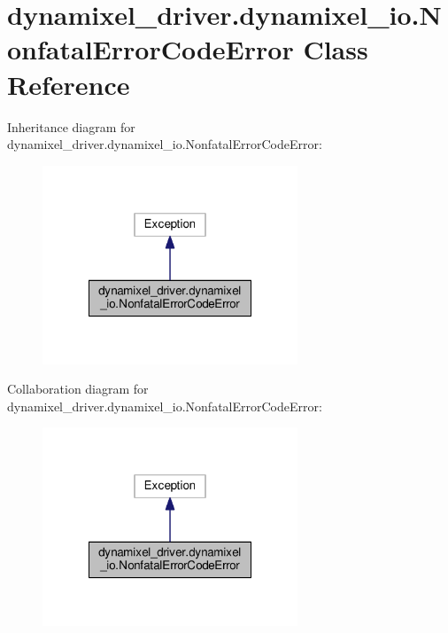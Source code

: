 \hypertarget{classdynamixel__driver_1_1dynamixel__io_1_1_nonfatal_error_code_error}{}\section{dynamixel\+\_\+driver.\+dynamixel\+\_\+io.\+Nonfatal\+Error\+Code\+Error Class Reference}
\label{classdynamixel__driver_1_1dynamixel__io_1_1_nonfatal_error_code_error}


Inheritance diagram for dynamixel\+\_\+driver.\+dynamixel\+\_\+io.\+Nonfatal\+Error\+Code\+Error\+:
\nopagebreak
\begin{figure}[H]
\begin{center}
\leavevmode
\includegraphics[width=216pt]{d7/dc7/classdynamixel__driver_1_1dynamixel__io_1_1_nonfatal_error_code_error__inherit__graph}
\end{center}
\end{figure}


Collaboration diagram for dynamixel\+\_\+driver.\+dynamixel\+\_\+io.\+Nonfatal\+Error\+Code\+Error\+:
\nopagebreak
\begin{figure}[H]
\begin{center}
\leavevmode
\includegraphics[width=216pt]{d5/d03/classdynamixel__driver_1_1dynamixel__io_1_1_nonfatal_error_code_error__coll__graph}
\end{center}
\end{figure}
